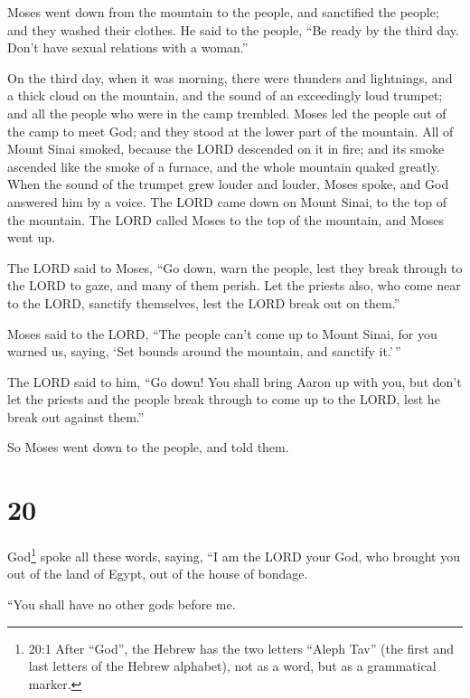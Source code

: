  Moses went down from the mountain to the people, and
sanctified the people; and they washed their clothes.  He
said to the people, ``Be ready by the third day. Don't have sexual
relations with a woman.''

 On the third day, when it was morning, there were thunders
and lightnings, and a thick cloud on the mountain, and the sound of an
exceedingly loud trumpet; and all the people who were in the camp
trembled.  Moses led the people out of the camp to meet
God; and they stood at the lower part of the mountain.  All
of Mount Sinai smoked, because the LORD descended on it in fire; and its
smoke ascended like the smoke of a furnace, and the whole mountain
quaked greatly.  When the sound of the trumpet grew louder
and louder, Moses spoke, and God answered him by a voice. 
The LORD came down on Mount Sinai, to the top of the mountain. The LORD
called Moses to the top of the mountain, and Moses went up.

 The LORD said to Moses, ``Go down, warn the people, lest
they break through to the LORD to gaze, and many of them perish.
 Let the priests also, who come near to the LORD, sanctify
themselves, lest the LORD break out on them.''

 Moses said to the LORD, ``The people can't come up to
Mount Sinai, for you warned us, saying, `Set bounds around the mountain,
and sanctify it.'\,''

 The LORD said to him, ``Go down! You shall bring Aaron up
with you, but don't let the priests and the people break through to come
up to the LORD, lest he break out against them.''

 So Moses went down to the people, and told them.

\hypertarget{section-19}{%
\section{20}\label{section-19}}

 God\footnote{20:1 After ``God'', the Hebrew has the two
  letters ``Aleph Tav'' (the first and last letters of the Hebrew
  alphabet), not as a word, but as a grammatical marker.} spoke all
these words, saying,  ``I am the LORD your God, who brought
you out of the land of Egypt, out of the house of bondage.

 ``You shall have no other gods before me.

